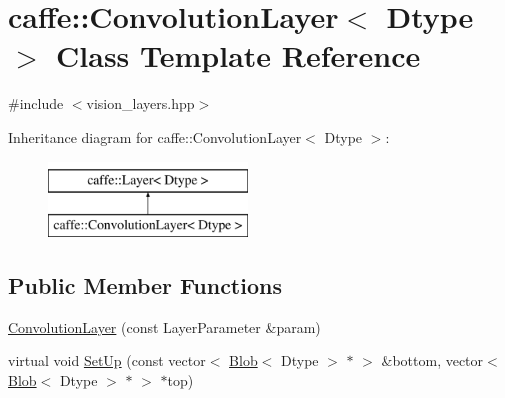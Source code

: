 \hypertarget{classcaffe_1_1_convolution_layer}{\section{caffe\+:\+:Convolution\+Layer$<$ Dtype $>$ Class Template Reference}
\label{classcaffe_1_1_convolution_layer}
}


{\ttfamily \#include $<$vision\+\_\+layers.\+hpp$>$}

Inheritance diagram for caffe\+:\+:Convolution\+Layer$<$ Dtype $>$\+:\begin{figure}[H]
\begin{center}
\leavevmode
\includegraphics[height=2.000000cm]{classcaffe_1_1_convolution_layer}
\end{center}
\end{figure}
\subsection*{Public Member Functions}
\begin{DoxyCompactItemize}
\item 
\hyperlink{classcaffe_1_1_convolution_layer_ad27360afd7729001b9e4f1d8c8401866}{Convolution\+Layer} (const Layer\+Parameter \&param)
\item 
virtual void \hyperlink{classcaffe_1_1_convolution_layer_ad3eebbeb87db98a784aea2ddd8e8199d}{Set\+Up} (const vector$<$ \hyperlink{classcaffe_1_1_blob}{Blob}$<$ Dtype $>$ $\ast$ $>$ \&bottom, vector$<$ \hyperlink{classcaffe_1_1_blob}{Blob}$<$ Dtype $>$ $\ast$ $>$ $\ast$top)
\end{DoxyCompactItemize}
